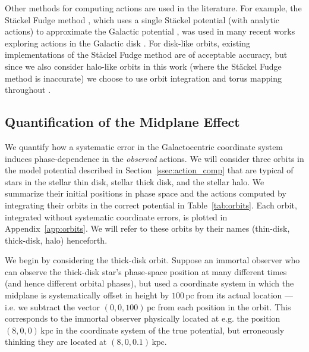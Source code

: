 \documentclass[twocolumn]{aastex62}
\newcommand{\pc}{\text{pc}}
\newcommand{\kpc}{\text{kpc}}
\begin{document}
Other methods for computing actions are used in the literature. For example,
the St\"ackel Fudge method \citep{2016MNRAS.457.2107S}, which uses a single
St\"ackel potential (with analytic actions) to approximate the Galactic
potential \citep{1985MNRAS.216..273D,2012MNRAS.426.1324B}, was used in many
recent works exploring actions in the Galactic disk
\citep[e.g.][]{2019MNRAS.484.3291T,2018MNRAS.481.4093S,2018arXiv180803278T}.
For disk-like orbits, existing implementations of the St\"ackel Fudge method
are of acceptable accuracy, but since we also consider halo-like orbits in
this work (where the St\"ackel Fudge method is inaccurate) we choose to use
orbit integration and torus mapping throughout \citep{2016MNRAS.457.2107S}.

\subsection{Quantification of the Midplane Effect} \label{ssec:quant}
We quantify how a systematic error in the Galactocentric coordinate system
induces phase-dependence in the {\em observed} actions. We will consider three
orbits in the model potential described in Section~\ref{ssec:action_comp} that
are typical of stars in the stellar thin disk, stellar thick disk, and the
stellar halo. We summarize their initial positions in phase space and the
actions computed by integrating their orbits in the correct potential in
Table~\ref{tab:orbits}. Each orbit, integrated without systematic coordinate
errors, is plotted in Appendix~\ref{app:orbits}. We will refer to these orbits
by their names (thin-disk, thick-disk, halo) henceforth.

We begin by considering the thick-disk orbit. Suppose an immortal observer who can observe
the thick-disk star's phase-space position at many different times (and hence
different orbital phases), but used a coordinate system in which the midplane
is systematically offset in height by $100\,\pc$ from its actual location ---
i.e. we subtract the vector $(0, 0, 100)\,\pc$ from each position in the
orbit. This corresponds to the immortal observer physically located at e.g. the position
$(8, 0, 0)\,\kpc$ in the coordinate system of the true potential, but
erroneously thinking they are located at $(8, 0, 0.1)\,\kpc$.
\end{document}
